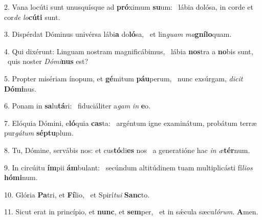 2. Vana locúti sunt unusquísque ad \textbf{pró}ximum \textbf{su}um: \ast\  lábia dolósa, in corde et cor\textit{de} \textit{lo}\textbf{cú}\textbf{ti} sunt.\

3. Dispérdat Dóminus univérsa lábi\textbf{a} do\textbf{ló}sa, \ast\  et lin\textit{guam} \textit{ma}\textbf{gní}\textbf{lo}quam.\

4. Qui dixérunt: Linguam nostram magnificábimus, \dag\  lábia \textbf{nos}tra a \textbf{no}bis sunt, \ast\  quis noster \textit{Dó}\textit{mi}\textbf{nus} est?\

5. Propter misériam ínopum, et \textbf{gé}mitum \textbf{páu}perum, \ast\  nunc exsúrgam, \textit{di}\textit{cit} \textbf{Dó}\textbf{mi}nus.\

6. Ponam in \textbf{sa}lu\textbf{tá}ri: \ast\  fiduciáliter a\textit{gam} \textit{in} \textbf{e}o.\

7. Elóquia Dómini, e\textbf{ló}quia \textbf{cas}ta: \ast\  argéntum igne examinátum, probátum terræ pur\textit{gá}\textit{tum} \textbf{sép}\textbf{tu}plum.\

8. Tu, Dómine, servábis nos: et cus\textbf{tó}di\textbf{es} nos \ast\  a generatióne hac \textit{in} \textit{æ}\textbf{tér}num.\

9. In circúitu \textbf{ím}pii \textbf{ám}bulant: \ast\  secúndum altitúdinem tuam multiplicásti fí\textit{li}\textit{os} \textbf{hó}\textbf{mi}num.\

10. Glória \textbf{Pa}tri, et \textbf{Fí}lio, \ast\  et Spirí\textit{tu}\textit{i} \textbf{Sanc}to.\

11. Sicut erat in princípio, et \textbf{nunc}, et \textbf{sem}per, \ast\  et in sǽcula sæcu\textit{ló}\textit{rum}. \textbf{A}men.\


